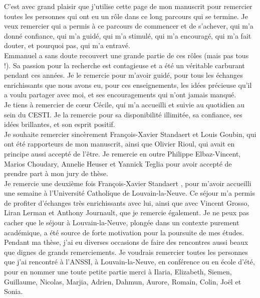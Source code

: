 C'est avec grand plaisir que j'utilise cette page de mon manuscrit pour remercier toutes les personnes qui ont eu un rôle dans ce long parcours qui se termine. Je veux remercier qui a permis à ce parcours de commencer et de s'achever, qui m'a donné confiance, qui m'a guidé, qui m'a stimulé, qui m'a encouragé, qui m'a fait douter, et pourquoi pas, qui m'a entravé. \\

Emmanuel a sans doute recouvert une grande partie de ces rôles (mais pas tous !). Sa passion pour la recherche est contagieuse et a été un véritable carburant pendant ces années. Je le remercie pour m'avoir guidé, pour tous les échanges enrichissants que nous avons eu, pour ces enseignements, les idées précieuse qu'il a voulu partager avec moi, et ses encouragements qui n'ont jamais manqué. \\

Je tiens à remercier de cœur Cécile, qui m'a accueilli et suivie au quotidien au sein du CESTI. Je la remercie pour sa disponibilité illimitée, sa confiance, ses idées brillantes, et son esprit positif. \\

Je souhaite remercier sincèrement François-Xavier Standaert et Louis Goubin, qui ont été rapporteurs de mon manuscrit, ainsi que Olivier Rioul, qui avait en principe aussi accepté de l'être. Je remercie en outre Philippe Elbaz-Vincent, Marios Choudary,  Annelie Heuser et Yannick Teglia  pour avoir accepté de prendre part à mon jury de thèse. \\

Je remercie une deuxième fois François-Xavier Standaert , pour m'avoir accueilli une semaine à l'Université Catholique de Louvain-la-Neuve. Ce séjour m'a permis de profiter d'échanges très enrichissants avec lui, ainsi que avec Vincent Grosso, Liran Lerman et Anthony Journault, que je remercie également. Je ne peux pas cacher que le séjour à Louvain-la-Neuve, plongée dans un contexte purement académique, a été source de forte motivation pour la poursuite de mes études. \\

Pendant ma thèse, j'ai eu diverses occasions de faire des rencontres aussi beaux que dignes de grands remerciements. Je voudrais remercier toutes les personnes que j'ai rencontré à l'ANSSI, à Louvain-la-Neuve, en conférence ou en école d'été, pour en nommer une toute petite partie merci à Ilaria, Elizabeth, Siemen, Guillaume, Nicolas, Marjia, Adrien, Dahmun, Aurore, Romain, Colin, Joël et Sonia.

